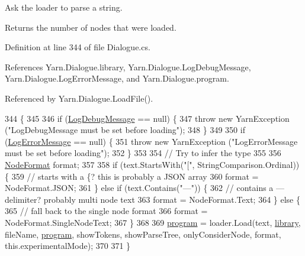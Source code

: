 Ask the loader to parse a string. 

Returns the number of nodes that were loaded. 

Definition at line 344 of file Dialogue.\-cs.



References Yarn.\-Dialogue.\-library, Yarn.\-Dialogue.\-Log\-Debug\-Message, Yarn.\-Dialogue.\-Log\-Error\-Message, and Yarn.\-Dialogue.\-program.



Referenced by Yarn.\-Dialogue.\-Load\-File().


\begin{DoxyCode}
344                                                                                                            
                                                 \{
345 
346             \textcolor{keywordflow}{if} (\hyperlink{a00082_a381f48bb0fbb294f8cf44ca57f11be31}{LogDebugMessage} == null) \{
347                 \textcolor{keywordflow}{throw} \textcolor{keyword}{new} YarnException (\textcolor{stringliteral}{"LogDebugMessage must be set before loading"});
348             \}
349 
350             \textcolor{keywordflow}{if} (\hyperlink{a00082_a9801e83dd044d6498fdf6ebcc6bec5ac}{LogErrorMessage} == null) \{
351                 \textcolor{keywordflow}{throw} \textcolor{keyword}{new} YarnException (\textcolor{stringliteral}{"LogErrorMessage must be set before loading"});
352             \}
353 
354             \textcolor{comment}{// Try to infer the type}
355 
356             \hyperlink{a00041_ad7ebb46e7309ead8767383a672b3272f}{NodeFormat} format;
357 
358             \textcolor{keywordflow}{if} (text.StartsWith(\textcolor{stringliteral}{"["}, StringComparison.Ordinal)) \{
359                 \textcolor{comment}{// starts with a \{? this is probably a JSON array}
360                 format = NodeFormat.JSON;
361             \} \textcolor{keywordflow}{else} \textcolor{keywordflow}{if} (text.Contains(\textcolor{stringliteral}{"---"})) \{
362                 \textcolor{comment}{// contains a --- delimiter? probably multi node text}
363                 format = NodeFormat.Text;
364             \} \textcolor{keywordflow}{else} \{
365                 \textcolor{comment}{// fall back to the single node format}
366                 format = NodeFormat.SingleNodeText;
367             \}
368 
369             \hyperlink{a00082_a0a1cca92325f430425d784d416cb5c2b}{program} = loader.Load(text, \hyperlink{a00082_ae660d4cfb6e296358d2f61d8ee74c66a}{library}, fileName, \hyperlink{a00082_a0a1cca92325f430425d784d416cb5c2b}{program}, showTokens, 
      showParseTree, onlyConsiderNode, format, this.experimentalMode);
370 
371         \}
\end{DoxyCode}


